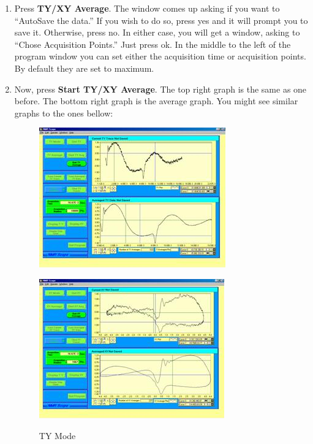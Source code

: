\documentclass{../lab}
\begin{document}
\begin{enumerate}
    \item Press \textbf{TY/XY Average}. The window comes up asking if you want to ``AutoSave the data.'' If you wish to do so, press yes and it will prompt you to save it. Otherwise, press no. In either case, you will get a window, asking to ``Chose Acquisition Points.'' Just press ok. In the middle to the left of the program window you can set either the acquisition time or acquisition points. By default they are set to maximum.
    
    \item Now, press \textbf{Start TY/XY Average}. The top right graph is the same as one before. The bottom right graph is the average graph. You might see similar graphs to the ones bellow:

    \begin{figure}[h]
    \begin{minipage}{0.49\linewidth}
        \centering
        \href{http://experimentationlab.berkeley.edu/sites/default/files/images/NMR38.jpg}{\includegraphics[width=\linewidth]{images/NMR38.jpg}}
        \caption{TY Mode}
    \end{minipage}\hfill
    \begin{minipage}{0.49\linewidth}
        \centering
        \href{http://experimentationlab.berkeley.edu/sites/default/files/images/NMR39.jpg}{\includegraphics[width=\linewidth]{images/NMR39.jpg}}

\end{minipage}
\end{figure}
\end{enumerate}
\end{document}
